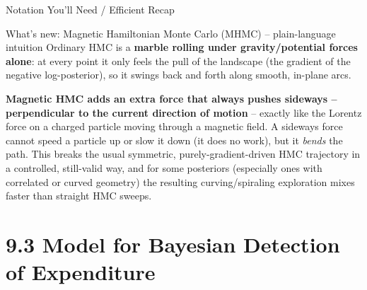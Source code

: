 \documentclass[aspectratio=169,10pt]{beamer}
\begin{document}
\begin{frame}[allowframebreaks]{Notation You'll Need / Efficient Recap}
\framebreak

\begin{block}{What's new: Magnetic Hamiltonian Monte Carlo (MHMC) -- plain-language intuition}
Ordinary HMC is a \textbf{marble rolling under gravity/potential forces
alone}: at every point it only feels the pull of the landscape
(the gradient of the negative log-posterior), so it swings back and forth
along smooth, in-plane arcs.

\medskip
\textbf{Magnetic HMC adds an extra force that always pushes sideways --
perpendicular to the current direction of motion} -- exactly like the
Lorentz force on a charged particle moving through a magnetic field. A
sideways force cannot speed a particle up or slow it down (it does no
work), but it \emph{bends} the path. This breaks the usual symmetric,
purely-gradient-driven HMC trajectory in a controlled, still-valid way, and
for some posteriors (especially ones with correlated or curved geometry)
the resulting curving/spiraling exploration mixes faster than straight HMC
sweeps.
\end{block}

\end{frame}

\section{9.3 Model for Bayesian Detection of Expenditure}
\end{document}
